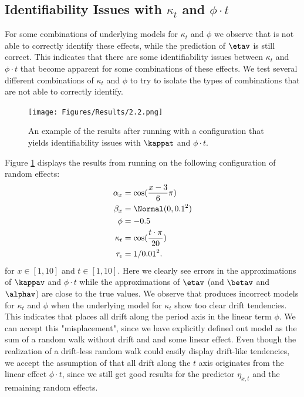 \subsection{Identifiability Issues with $\kappa_t$ and $\phi\cdot t$}
\label{sec:IdentifiabilityKappa}
For some combinations of underlying models for $\kappa_t$ and $\phi$ we observe that \inlabru is not able to correctly identify these effects, while the prediction of $\etav$ is still correct. This indicates that there are some identifiability issues between $\kappa_t$ and $\phi \cdot t$ that become apparent for some combinations of these effects. We test several different combinations of $\kappa_t$ and $\phi$ to try to isolate the types of combinations that \inlabru are not able to correctly identify.
\begin{figure}[h!]
    \centering
    \texttt{[image: Figures/Results/2.2.png]}
    \caption{An example of the results after running \inlabru with a configuration that yields identifiability issues with $\kappat$ and $\phi \cdot t$. }
    \label{fig:unidentifiabilityKappa}
\end{figure}
Figure \ref{fig:unidentifiabilityKappa} displays the results from running \inlabru on the following configuration of random effects:
\begin{equation}
    \begin{aligned}
    \alpha_x &= \cos(\frac{x-3}{6}\pi)\\
    \beta_x &= \Normal(0,0.1^2)\\
    \phi &= -0.5\\
    \kappa_t &= \cos(\frac{t\cdot \pi}{20})\\
    \tau_{\epsilon} &= 1/0.01^2.
    \end{aligned}
\end{equation}
for $x\in[1,10]$ and $t\in[1,10]$. Here we clearly see errors in the approximations of $\kappav$ and $\phi\cdot t$ while the approximations of $\etav$ (and $\betav$ and $\alphav$) are close to the true values. We observe that \inlabru produces incorrect models for $\kappa_t$ and $\phi$ when the underlying model for $\kappa_t$ show too clear drift tendencies. This indicates that \inlabru places all drift along the period axis in the linear term $\phi$. We can accept this "misplacement", since we have explicitly defined out model as the sum of a random walk without drift and and some linear effect. Even though the realization of a drift-less random walk could easily display drift-like tendencies, we accept the assumption of \inlabru that all drift along the $t$ axis originates from the linear effect $\phi \cdot t$, since we still get good results for the predictor $\eta_{x,t}$ and the remaining random effects.


